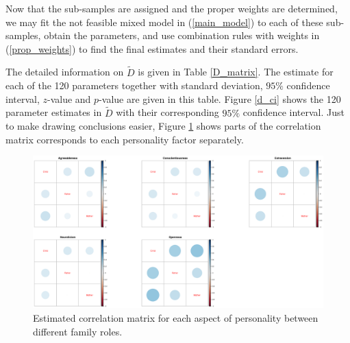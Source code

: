 \documentclass[11pt,a5paper,twoside]{book}
\begin{document}
Now that the sub-samples are assigned and the proper weights are determined, we may fit the not feasible mixed model in (\ref{main_model}) to each of these sub-samples, obtain the parameters, and use combination rules with weights in (\ref{prop_weights}) to find the final estimates and their standard errors.

The detailed information on $\tilde{D}$ is given in Table \ref{D_matrix}. The estimate for each of the 120 parameters together with standard deviation, $95\%$ confidence interval, $z$-value and $p$-value are given in this table. Figure \ref{d_ci} shows the 120 parameter estimates in $\tilde{D}$ with their corresponding $95\%$ confidence interval. Just to make drawing conclusions easier, Figure \ref{corr_sep} shows parts of the correlation matrix corresponds to each personality factor separately.



\begin{figure}
\centering
\includegraphics[width=\textwidth]{cor_separate.eps}
\caption{Estimated correlation matrix for each aspect of personality between different family roles.} \label{corr_sep}
\end{figure} 
\end{document}
